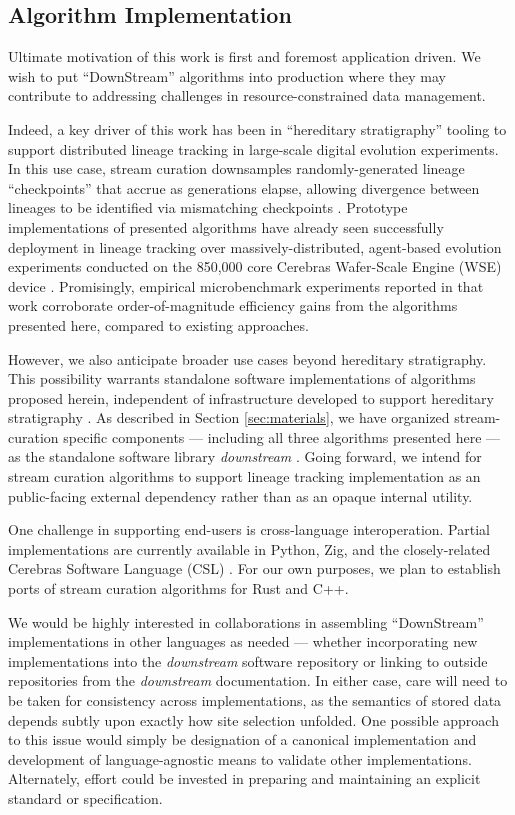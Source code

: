 \subsection{Algorithm Implementation}

Ultimate motivation of this work is first and foremost application driven.
We wish to put ``DownStream'' algorithms into production where they may contribute to addressing challenges in resource-constrained data management.

Indeed, a key driver of this work has been in ``hereditary stratigraphy'' tooling to support distributed lineage tracking in large-scale digital evolution experiments.
In this use case, stream curation downsamples randomly-generated lineage ``checkpoints'' that accrue as generations elapse, allowing divergence between lineages to be identified via mismatching checkpoints \citep{moreno2022hereditary}.
Prototype implementations of presented algorithms have already seen successfully deployment in lineage tracking over massively-distributed, agent-based evolution experiments conducted on the 850,000 core Cerebras Wafer-Scale Engine (WSE) device \citep{moreno2024trackable}.
Promisingly, empirical microbenchmark experiments reported in that work corroborate order-of-magnitude efficiency gains from the algorithms presented here, compared to existing approaches.

However, we also anticipate broader use cases beyond hereditary stratigraphy.
This possibility warrants standalone software implementations of algorithms proposed herein, independent of infrastructure developed to support hereditary stratigraphy \citep{moreno2022hstrat}.
As described in Section \ref{sec:materials}, we have organized stream-curation specific components --- including all three algorithms presented here --- as the standalone software library \textit{downstream} \citep{moreno2024downstream}.
Going forward, we intend for stream curation algorithms to support lineage tracking implementation as an public-facing external dependency rather than as an opaque internal utility.

One challenge in supporting end-users is cross-language interoperation.
Partial implementations are currently available in Python, Zig, and the closely-related Cerebras Software Language (CSL) \citep{moreno2024hsurf,moreno2024downstream,moreno2024wse}.
For our own purposes, we plan to establish ports of stream curation algorithms for Rust and C++.

We would be highly interested in collaborations in assembling ``DownStream'' implementations in other languages as needed --- whether incorporating new implementations into the \textit{downstream} software repository or linking to outside repositories from the \textit{downstream} documentation.
In either case, care will need to be taken for consistency across implementations, as the semantics of stored data depends subtly upon exactly how site selection unfolded.
One possible approach to this issue would simply be designation of a canonical implementation and development of language-agnostic means to validate other implementations.
Alternately, effort could be invested in preparing and maintaining an explicit standard or specification.
